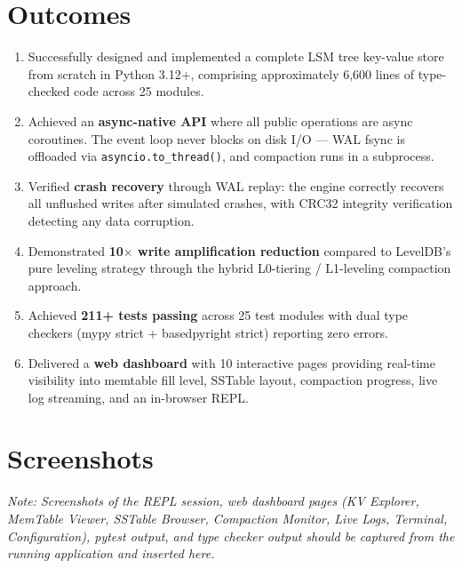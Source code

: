 \documentclass[oneside,a4paper,12pt]{book}
\begin{document}
\section{Outcomes}

\begin{enumerate}[leftmargin=2em]
    \item Successfully designed and implemented a complete LSM tree key-value store from scratch in Python 3.12+, comprising approximately 6,600 lines of type-checked code across 25 modules.

    \item Achieved an \textbf{async-native API} where all public operations are async coroutines. The event loop never blocks on disk I/O --- WAL fsync is offloaded via \texttt{asyncio.to\_thread()}, and compaction runs in a subprocess.

    \item Verified \textbf{crash recovery} through WAL replay: the engine correctly recovers all unflushed writes after simulated crashes, with CRC32 integrity verification detecting any data corruption.

    \item Demonstrated \textbf{10$\times$ write amplification reduction} compared to LevelDB's pure leveling strategy through the hybrid L0-tiering / L1-leveling compaction approach.

    \item Achieved \textbf{211+ tests passing} across 25 test modules with dual type checkers (mypy strict + basedpyright strict) reporting zero errors.

    \item Delivered a \textbf{web dashboard} with 10 interactive pages providing real-time visibility into memtable fill level, SSTable layout, compaction progress, live log streaming, and an in-browser REPL.
\end{enumerate}

\section{Screenshots}

\textit{Note: Screenshots of the REPL session, web dashboard pages (KV Explorer, MemTable Viewer, SSTable Browser, Compaction Monitor, Live Logs, Terminal, Configuration), pytest output, and type checker output should be captured from the running application and inserted here.}

\end{document}

